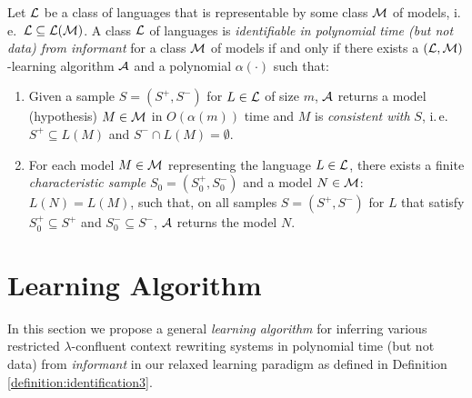\begin{definition}\label{definition:identification3}
Let $\textup{\sf $\mathcal{L}$}$ be a class of languages that is representable by some class $\textup{\sf $\mathcal{M}$}$ of models, i.\,e.\  $\textup{\sf $\mathcal{L}$} \subseteq {\cal L}(\textup{\sf $\mathcal{M}$})$. A class $\textup{\sf $\mathcal{L}$}$ of languages is \emph{identifiable in polynomial time (but not data) from informant} for a class $\textup{\sf $\mathcal{M}$}$ of models if and only if there exists a $(\textup{\sf $\mathcal{L}$}, \textup{\sf $\mathcal{M}$})$-learning algorithm $\textup{\sf $\mathcal{A}$}$ and a polynomial $\alpha(\cdot)$ such that:
\begin{enumerate}
\item\label{relaxed-polynomial1} Given a sample $S = (S^+, S^-)$ for $L \in \textup{\sf $\mathcal{L}$}$ of size $m$, $\textup{\sf $\mathcal{A}$}$ returns a model (hypothesis) $M \in \textup{\sf $\mathcal{M}$}$ in $O(\alpha(m))$ time and $M$ is \emph{consistent with} $S$, i.\,e.\ $S^+ \subseteq L(M)$ and $S^- \cap L(M) = \emptyset$.

\item\label{relaxed-polynomial2} For each model $M \in \textup{\sf $\mathcal{M}$}$ representing the language $L \in \textup{\sf $\mathcal{L}$}$, there exists a finite \emph{characteristic sample} $S_0 = (S_0^+, S_0^-)$ and a model $N \in \textup{\sf $\mathcal{M}$}$: $L(N) = L(M)$, such that, on all samples $S = (S^+, S^-)$ for $L$ that satisfy $S_0^+ \subseteq S^+$ and $S_0^- \subseteq S^-$, $\textup{\sf $\mathcal{A}$}$ returns the model $N$.
\end{enumerate}
\end{definition}

\section{Learning Algorithm}\label{section:algorithm}

In this section we propose a general \emph{learning algorithm} for inferring various restricted $\lambda$-confluent context rewriting systems in polynomial time (but not data) from \emph{informant} in our relaxed learning paradigm as defined in Definition \ref{definition:identification3}.

